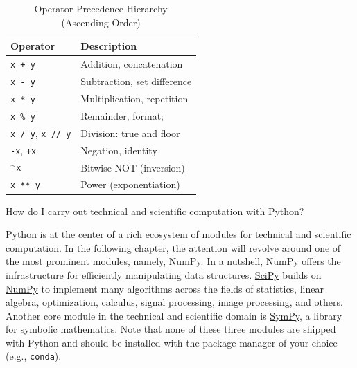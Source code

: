 \documentclass[a4paper,11pt]{book}
\newcommand{\question}[1]{%
    \begin{tcolorbox}[colback=comp_c!10,colframe=comp_c,sidebyside align=top,width=\linewidth,before skip=1ex]
        #1
    \end{tcolorbox}
    \switchcolumn%
}
\newcommand{\note}[1]{%
    \begin{tcolorbox}[colback=white!0,colframe=white!10,width=\linewidth,before skip=1ex]
        #1
    \end{tcolorbox}
}
\begin{document}
\begin{table}[!htbp]
	\centering
	\caption{Operator Precedence Hierarchy \\(Ascending Order)}
	\label{tab:operator_precedence}
	\begin{tabular}{ll}
		\toprule \toprule
        Operator & Description\\ 
        \midrule
        \texttt{x + y}    & Addition, concatenation \\
        \texttt{x - y}    & Subtraction, set difference \\
        \texttt{x * y}    & Multiplication, repetition \\ 
        \texttt{x \% y}   & Remainder, format; \\
        \texttt{x / y}, \texttt{x // y} & Division: true and floor \\
        \texttt{-x}, \texttt{+x} & Negation, identity \\
        \texttt{$^{\sim}$x}       & Bitwise NOT (inversion) \\
        \texttt{x ** y}  & Power (exponentiation) \\
        \bottomrule
    \end{tabular}
\end{table}

\begin{paracol}{2}
	\question{\raggedright How do I carry out technical and scientific computation with Python?}
	\note{Python is at the center of a rich ecosystem of modules for technical and scientific computation. In the following chapter, the attention will revolve around one of the most prominent modules, namely, \href{https://numpy.org/}{NumPy}. In a nutshell, \href{https://numpy.org/}{NumPy} offers the infrastructure for efficiently manipulating data structures. \href{https://scipy.org/}{SciPy} builds on \href{https://numpy.org/}{NumPy} to implement many algorithms across the fields of statistics, linear algebra, optimization, calculus, signal processing,  image processing, and others. Another core module in the technical and scientific domain is \href{https://www.sympy.org/en/index.html}{SymPy}, a library for symbolic mathematics. Note that none of these three modules are shipped with Python and should be installed with the package manager of your choice (e.g., \texttt{conda}).}
\end{paracol}
\clearpage
\end{document}
